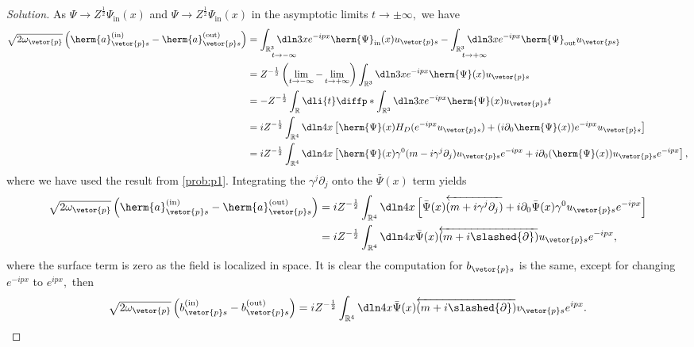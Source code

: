 \begin{proof}[Solution]
   As \(\Psi \to Z^{\frac12} \Psi_\mathrm{in}(x)\) and \(\Psi \to Z^{\frac12} \Psi_\mathrm{in}(x)\) in the asymptotic limits \(t \to \pm\infty,\) we have
   \begin{align*}
      \sqrt{2 \omega_{\vetor{p}}} \left({\herm{a}}_{\vetor{p} s}^{(\mathrm{in})} - {\herm{a}}_{\vetor{p} s}^{(\mathrm{out})}\right) 
      &= \underset{t \to -\infty}{\int_{\mathbb{R}^3}\dln3x}  e^{-ipx} \herm{\Psi}_{\mathrm{in}}(x) u_{\vetor{p}s} - \underset{t\to +\infty}{\int_{\mathbb{R}^3}\dln3x} e^{-ipx} \herm{\Psi}_{\mathrm{out}} u_{\vetor{ps}}\\
      &= Z^{-\frac12} \left(\lim_{t\to-\infty} - \lim_{t\to+\infty}\right) \int_{\mathbb{R}^3} \dln3x e^{-ipx} \herm{\Psi}(x) u_{\vetor{p}s}\\
      &= -Z^{-\frac12} \int_{\mathbb{R}} \dli{t} \diffp*{\int_{\mathbb{R}^3} \dln3x e^{-ipx} \herm{\Psi}(x) u_{\vetor{p}s}}{t}\\
      &= iZ^{-\frac12} \int_{\mathbb{R}^4} \dln4x  \left[\herm{\Psi}(x) H_D(e^{-ipx} u_{\vetor{p}s}) + (i\partial_0 \herm{\Psi}(x))e^{-ipx} u_{\vetor{p}s}\right]\\
      &= iZ^{-\frac12} \int_{\mathbb{R}^4} \dln4x \left[\herm{\Psi}(x) \gamma^0 (m - i \gamma^j \partial_j) u_{\vetor{p}s} e^{-ipx} + i \partial_0(\herm{\Psi}(x))u_{\vetor{p}s} e^{-ipx}\right],
   \end{align*}
   where we have used the result from \cref{prob:p1}. Integrating the \(\gamma^j \partial_j\) onto the \(\bar{\Psi}(x)\) term yields
   \begin{align*}
      \sqrt{2 \omega_{\vetor{p}}} \left({\herm{a}}_{\vetor{p} s}^{(\mathrm{in})} - {\herm{a}}_{\vetor{p} s}^{(\mathrm{out})}\right) 
      &= i Z^{-\frac12} \int_{\mathbb{R}^4}\dln4x \left[\bar{\Psi}(x)\overleftarrow{(m + i \gamma^j \partial_j)} + i \partial_0 \bar{\Psi}(x) \gamma^0 u_{\vetor{p}s} e^{-ipx}\right]\\
      &= i Z^{-\frac12} \int_{\mathbb{R}^4} \dln4x \bar{\Psi}(x) \overleftarrow{(m + i \slashed{\partial})} u_{\vetor{p}s} e^{-ipx},
   \end{align*}
   where the surface term is zero as the field is localized in space. It is clear the computation for \(b_{\vetor{p}s}\) is the same, except for changing \(e^{-ipx}\) to \(e^{ipx},\) then
   \begin{equation*}
      \sqrt{2 \omega_{\vetor{p}}} \left({b}_{\vetor{p} s}^{(\mathrm{in})} - {b}_{\vetor{p} s}^{(\mathrm{out})}\right) 
      = i Z^{-\frac12} \int_{\mathbb{R}^4} \dln4x \bar{\Psi}(x) \overleftarrow{(m + i \slashed{\partial})} v_{\vetor{p}s} e^{ipx}.

\end{equation*}
\end{proof}
